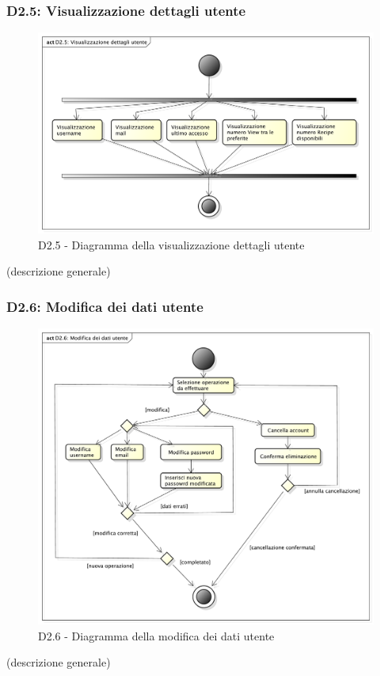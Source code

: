 		\subsubsection{D2.5: Visualizzazione dettagli utente} %
		\label{ssub:visualizzazione_dettagli_utente}
		\begin{figure}[!htbp]
			\centering
			\centerline{\includegraphics[scale=0.45]{./images/D2_5.pdf}}
			\caption{D2.5 - Diagramma della visualizzazione dettagli utente}
		\end{figure}
		\noindent
		[TO DO] (descrizione generale)

		\subsubsection{D2.6: Modifica dei dati utente} %
		\label{ssub:modifica_dei_dati_utente}
		\begin{figure}[!htbp]
			\centering
			\centerline{\includegraphics[scale=0.45]{./images/D2_6.pdf}}
			\caption{D2.6 - Diagramma della modifica dei dati utente}
		\end{figure}
		\noindent
		[TO DO] (descrizione generale)


